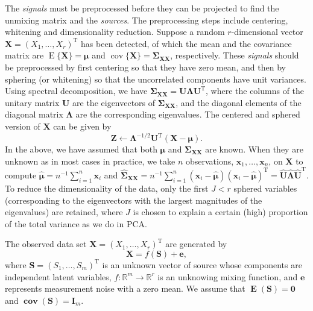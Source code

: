 The \textit{signals} must be preprocessed before they can be projected to find the unmixing matrix and the \textit{sources}. The preprocessing steps include centering, whitening and dimensionality reduction. Suppose a random $r$-dimensional vector $\mathbf{X}=(X_1,\dots,X_r)^{\operatorname{T}}$ has been detected, of which the mean and the covariance matrix are $\operatorname{E}\{\mathbf{X}\}=\boldsymbol{\mu}$ and $\operatorname{cov}\{\mathbf{X}\}=\boldsymbol{\Sigma}_{\mathbf{XX}}$, respectively. These \textit{signals} should be preprocessed by first centering so that they have zero mean, and then by sphering (or whitening) so that the uncorrelated components have unit variances. Using spectral decomposition, we have $\boldsymbol{\Sigma}_{\mathbf{XX}}=\mathbf{U}\boldsymbol{\Lambda}\mathbf{U}^{\operatorname{T}}$, where the columns of the unitary matrix $\mathbf{U}$ are the eigenvectors of $\boldsymbol{\Sigma}_{\mathbf{XX}}$, and the diagonal elements of the diagonal matrix $\boldsymbol{\Lambda}$ are the corresponding eigenvalues. The centered and sphered version of $\mathbf{X}$ can be given by
\begin{equation}
    \mathbf{Z}\leftarrow \boldsymbol{\Lambda}^{-1/2}\mathbf{U}^{\operatorname{T}}(\mathbf{X}-\boldsymbol{\mu}).
\end{equation}
In the above, we have assumed that both $\boldsymbol{\mu}$ and $\boldsymbol{\Sigma}_{\mathbf{XX}}$ are known. When they are unknown as in most cases in practice, we take $n$ observations, $\mathbf{x}_1, \dots, \mathbf{x}_n$, on $\mathbf{X}$ to compute $\hat{\boldsymbol{\mu}}=n^{-1}\sum_{i=1}^n\mathbf{x}_i$ and $\hat{\boldsymbol{\Sigma}}_{\mathbf{XX}}=n^{-1}\sum_{i=1}^n(\mathbf{x}_i-\hat{\boldsymbol{\mu}})(\mathbf{x}_i-\hat{\boldsymbol{\mu}})^{\operatorname{T}}=\hat{\mathbf{U}}\hat{\boldsymbol{\Lambda}}\hat{\mathbf{U}}^{\operatorname{T}}$. To reduce the dimensionality of the data, only the first $J < r$ sphered variables (corresponding to the eigenvectors with the largest magnitudes of the eigenvalues) are retained, where $J$ is chosen to explain a certain (high) proportion of the total variance as we do in PCA.

The observed data set $\mathbf{X}=(X_1,\dots,X_r)^{\operatorname{T}}$ are generated by
\begin{equation}
	\mathbf{X}=f(\mathbf{S})+\mathbf{e},
	\label{eq:DR:ICA:signalfromsource}
\end{equation}
where $\mathbf{S}=(S_1,\dots,S_m)^{\operatorname{T}}$ is an unknown vector of source whose components are independent latent variables, $f:\mathbb{R}^m\to \mathbb{R}^r$ is an unknowing mixing function, and $\mathbf{e}$ represents measurement noise with a zero mean. We assume that $\boldsymbol{\operatorname{E}}(\mathbf{S})=\mathbf{0}$ and $\boldsymbol{\operatorname{cov}}(\mathbf{S})=\mathbf{I}_m$. 


